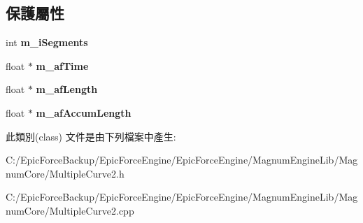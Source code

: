 \subsection*{保護屬性}
\begin{DoxyCompactItemize}
\item 
int {\bfseries m\+\_\+i\+Segments}\hypertarget{class_magnum_1_1_multiple_curve2_a2733b8c7d79b4f6ebf9c7821ca042d61}{}\label{class_magnum_1_1_multiple_curve2_a2733b8c7d79b4f6ebf9c7821ca042d61}

\item 
float $\ast$ {\bfseries m\+\_\+af\+Time}\hypertarget{class_magnum_1_1_multiple_curve2_ad2a18335c1a9a0647844b5b6c7571849}{}\label{class_magnum_1_1_multiple_curve2_ad2a18335c1a9a0647844b5b6c7571849}

\item 
float $\ast$ {\bfseries m\+\_\+af\+Length}\hypertarget{class_magnum_1_1_multiple_curve2_a362365560a0f2f1844c9b1c201d1909a}{}\label{class_magnum_1_1_multiple_curve2_a362365560a0f2f1844c9b1c201d1909a}

\item 
float $\ast$ {\bfseries m\+\_\+af\+Accum\+Length}\hypertarget{class_magnum_1_1_multiple_curve2_a642bc249955be311af470102a2bfa83c}{}\label{class_magnum_1_1_multiple_curve2_a642bc249955be311af470102a2bfa83c}

\end{DoxyCompactItemize}


此類別(class) 文件是由下列檔案中產生\+:\begin{DoxyCompactItemize}
\item 
C\+:/\+Epic\+Force\+Backup/\+Epic\+Force\+Engine/\+Epic\+Force\+Engine/\+Magnum\+Engine\+Lib/\+Magnum\+Core/Multiple\+Curve2.\+h\item 
C\+:/\+Epic\+Force\+Backup/\+Epic\+Force\+Engine/\+Epic\+Force\+Engine/\+Magnum\+Engine\+Lib/\+Magnum\+Core/Multiple\+Curve2.\+cpp\end{DoxyCompactItemize}
